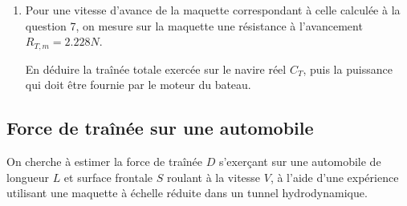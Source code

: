 \begin{enumerate}
\item  Pour une vitesse d'avance de la maquette correspondant à celle calculée à la question 7, on mesure sur la maquette une résistance à l'avancement 
{\color{red} $R_{T,m}  = 2.228 N$.} 

En déduire la traînée totale exercée sur le navire réel $C_T$, puis la puissance qui doit être fournie par le moteur du bateau.



\end{enumerate}



\subsection{Force de traînée sur une automobile}

On cherche à estimer la force de traînée $D$ s'exerçant sur une automobile de longueur $L$ et surface frontale $S$ roulant à la vitesse $V$, à l'aide d'une expérience utilisant une maquette à échelle réduite dans un tunnel hydrodynamique.

